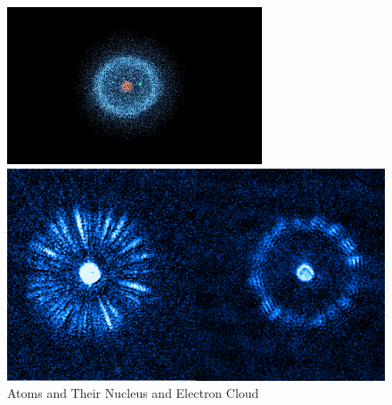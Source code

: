 \documentclass[10pt]{article}
\numberwithin{equation}{section}
\begin{document}
\begin{figure}[H]
\centering
  \begin{minipage}[b]{0.4\textwidth}
\includegraphics[width=\textwidth]{./concept_1.jpeg}
  \end{minipage}
    \begin{minipage}[b]{0.4\textwidth}
\includegraphics[width=\textwidth]{./concept_2.png}
  \end{minipage}
 \caption{Atoms and Their Nucleus and Electron Cloud}\label{fig1} 
\label{fig1}
\end{figure}
\end{document}
